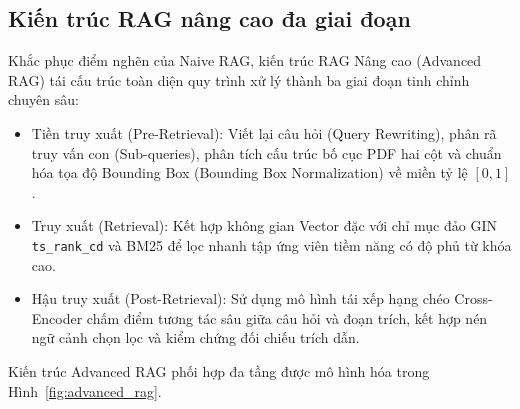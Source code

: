 \subsection{Kiến trúc RAG nâng cao đa giai đoạn}
\label{subsec:advanced_rag_architecture}
Khắc phục điểm nghẽn của Naive RAG, kiến trúc RAG Nâng cao (Advanced RAG) tái cấu trúc toàn diện quy trình xử lý thành ba giai đoạn tinh chỉnh chuyên sâu:
\begin{itemize}
    \item Tiền truy xuất (Pre-Retrieval): Viết lại câu hỏi (Query Rewriting), phân rã truy vấn con (Sub-queries), phân tích cấu trúc bố cục PDF hai cột và chuẩn hóa tọa độ Bounding Box (Bounding Box Normalization) về miền tỷ lệ $[0, 1]$.
    \item Truy xuất (Retrieval): Kết hợp không gian Vector đặc với chỉ mục đảo GIN \texttt{ts\_rank\_cd} và BM25 để lọc nhanh tập ứng viên tiềm năng có độ phủ từ khóa cao.
    \item Hậu truy xuất (Post-Retrieval): Sử dụng mô hình tái xếp hạng chéo Cross-Encoder chấm điểm tương tác sâu giữa câu hỏi và đoạn trích, kết hợp nén ngữ cảnh chọn lọc và kiểm chứng đối chiếu trích dẫn.
\end{itemize}

Kiến trúc Advanced RAG phối hợp đa tầng được mô hình hóa trong Hình~\ref{fig:advanced_rag}.


